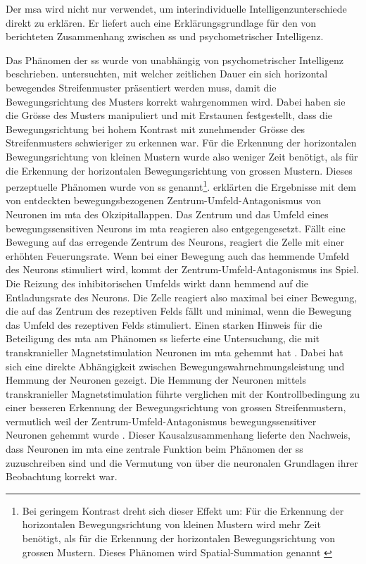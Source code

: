 \documentclass[11pt, twoside, a4paper]{book}		%
\begin{document}
Der \gls{msa} wird nicht nur verwendet, um interindividuelle Intelligenzunterschiede direkt zu erklären. Er liefert auch eine Erklärungsgrundlage für den von \citet{Melnick2013} berichteten Zusammenhang zwischen \gls{ss} und psychometrischer Intelligenz.

Das Phänomen der \gls{ss} wurde von \citet{Tadin2003} unabhängig von psychometrischer Intelligenz beschrieben. \citeauthor{Tadin2003} untersuchten, mit welcher zeitlichen Dauer ein sich horizontal bewegendes Streifenmuster präsentiert werden muss, damit die Bewegungsrichtung des Musters korrekt wahrgenommen wird. Dabei haben sie die Grösse des Musters manipuliert und mit Erstaunen festgestellt, dass die Bewegungsrichtung bei hohem Kontrast mit zunehmender Grösse des Streifenmusters schwieriger zu erkennen war. Für die Erkennung der horizontalen Bewegungsrichtung von kleinen Mustern wurde also weniger Zeit benötigt, als für die Erkennung der horizontalen Bewegungsrichtung von grossen Mustern. Dieses perzeptuelle Phänomen wurde von \citeauthor{Tadin2003} \gls{ss} genannt\footnote{Bei geringem Kontrast dreht sich dieser Effekt um: Für die Erkennung der horizontalen Bewegungsrichtung von kleinen Mustern wird mehr Zeit benötigt, als für die Erkennung der horizontalen Bewegungsrichtung von grossen Mustern. Dieses Phänomen wird Spatial-Summation genannt \citep{Kapadia1999, Levitt1997, Pack2005}}. \citeauthor{Tadin2003} erklärten die Ergebnisse mit dem von \citet{Allman1985a} entdeckten bewegungsbezogenen Zentrum-Umfeld-Antagonismus von Neuronen im \gls{mta} des Okzipitallappen. Das Zentrum und das Umfeld eines bewegungssensitiven Neurons im \gls{mta} reagieren also entgegengesetzt. Fällt eine Bewegung auf das erregende Zentrum des Neurons, reagiert die Zelle mit einer erhöhten Feuerungsrate. Wenn bei einer Bewegung auch das hemmende Umfeld des Neurons stimuliert wird, kommt der Zentrum-Umfeld-Antagonismus ins Spiel. Die Reizung des inhibitorischen Umfelds wirkt dann hemmend auf die Entladungsrate des Neurons. Die Zelle reagiert also maximal bei einer Bewegung, die auf das Zentrum des rezeptiven Felds fällt und minimal, wenn die Bewegung das Umfeld des rezeptiven Felds stimuliert. Einen starken Hinweis für die Beteiligung des \gls{mta} am Phänomen \gls{ss} lieferte eine Untersuchung, die mit transkranieller Magnetstimulation Neuronen im \gls{mta} gehemmt hat \citep{Tadin2011}. 
Dabei hat sich eine direkte Abhängigkeit zwischen Bewegungswahrnehmungsleistung und Hemmung der Neuronen gezeigt. Die Hemmung der Neuronen mittels transkranieller Magnetstimulation führte verglichen mit der Kontrollbedingung zu einer besseren Erkennung der Bewegungsrichtung von grossen Streifenmustern, vermutlich weil der Zentrum-Umfeld-Antagonismus bewegungssensitiver Neuronen gehemmt wurde \citep{Tadin2011}. Dieser Kausalzusammenhang lieferte den Nachweis, dass Neuronen im \gls{mta} eine zentrale Funktion beim Phänomen der \gls{ss} zuzuschreiben sind und die Vermutung von \citet{Tadin2003} über die neuronalen Grundlagen ihrer Beobachtung korrekt war. 
\end{document}
